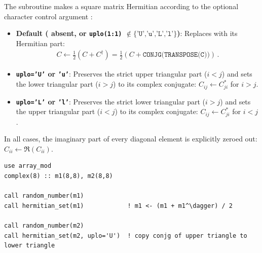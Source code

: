 The subroutine  makes a square  matrix  Hermitian according to the optional character control argument :
\begin{itemize}
  \item \textbf{Default ( absent, or \texttt{uplo(1:1)} $\notin \{\texttt{'U','u','L','l'}\}$)}: Replaces  with its Hermitian part:
  \begin{align}
    C \leftarrow \frac{1}{2}\left(C + C^\dagger\right) = \frac{1}{2}\left(C + \texttt{CONJG(TRANSPOSE(C))}\right)\, .
  \end{align}
  \item \textbf{\texttt{uplo='U'} or \texttt{'u'}}: Preserves the strict upper triangular part ($i < j$) and sets the lower triangular part ($i > j$) to its complex conjugate: $C_{ij} \leftarrow C_{ji}^*$ for $i > j$.
  \item \textbf{\texttt{uplo='L'} or \texttt{'l'}}: Preserves the strict lower triangular part ($i > j$) and sets the upper triangular part ($i < j$) to its complex conjugate: $C_{ij} \leftarrow C_{ji}^*$ for $i < j$.
\end{itemize}
In all cases, the imaginary part of every diagonal element is explicitly zeroed out: $C_{ii} \leftarrow \Re(C_{ii})$.

\begin{description}[leftmargin=2.2cm, style=nextline]
\end{description}

\lstset{language=[95]Fortran}
\begin{lstlisting}
use array_mod
complex(8) :: m1(8,8), m2(8,8)

call random_number(m1)
call hermitian_set(m1)            ! m1 <- (m1 + m1^\dagger) / 2

call random_number(m2)
call hermitian_set(m2, uplo='U')  ! copy conjg of upper triangle to lower triangle
\end{lstlisting}


